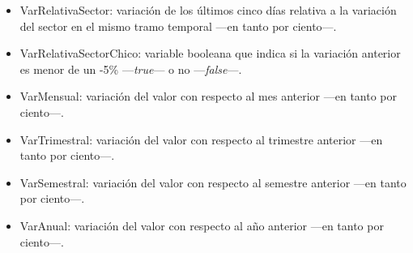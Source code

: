 \documentclass[a4paper, 11pt, titlepage]{article}
\theoremstyle{definition}
\begin{document}
\begin{enumerate}
\begin{itemize}
            \item VarRelativaSector: variación de los últimos cinco días relativa a la variación del sector en el mismo tramo temporal ---en tanto por ciento---.
            \item VarRelativaSectorChico: variable booleana que indica si la variación anterior es menor de un -5\% ---\emph{true}--- o no ---\emph{false}---.
            \item VarMensual: variación del valor con respecto al mes anterior ---en tanto por ciento---.
            \item VarTrimestral: variación del valor con respecto al trimestre anterior ---en tanto por ciento---.
            \item VarSemestral: variación del valor con respecto al semestre anterior ---en tanto por ciento---.
            \item VarAnual: variación del valor con respecto al año anterior ---en tanto por ciento---.
        \end{itemize}


\end{enumerate}
\end{document}
